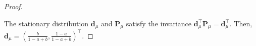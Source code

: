 \begin{proof}
    \label{th3proof}   

The stationary distribution $\bm{d}_{\mu}$ and 
$\textbf{P}_{\mu}$ satisfy the  invariance $\bm{d}_\mu^{\top}\mathbf{P}_\mu = \bm{d}_\mu^{\top}$. 
Then, %
$\bm{d}_\mu =(\frac{b}{1-a+b},\frac{1-a}{1-a+b})^{\top}$.


\end{proof}

